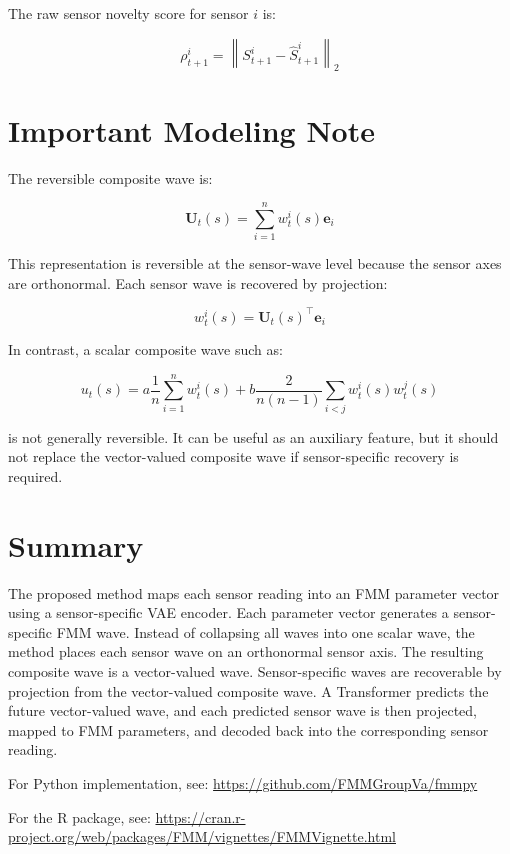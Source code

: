 \documentclass[a4paper]{article}
\begin{document}
        The raw sensor novelty score for sensor \(i\) is:
        
        \begin{equation}
            \rho_{t+1}^i
            =
            \left\lVert
                S_{t+1}^i
            -
                \hat{S}_{t+1}^i
            \right\rVert_2
        \end{equation}
    
    
    \section{Important Modeling Note}
        
        The reversible composite wave is:
        
        \begin{equation}
            \mathbf{U}_t(s)
            =
            \sum_{i=1}^{n}
            w_t^i(s)
            \mathbf{e}_i
        \end{equation}
        
        This representation is reversible at the sensor-wave level because the sensor axes are orthonormal.
        Each sensor wave is recovered by projection:
        
        \begin{equation}
            w_t^i(s)
            =
            \mathbf{U}_t(s)^{\top}
            \mathbf{e}_i
        \end{equation}
        
        In contrast, a scalar composite wave such as:
        
        \begin{equation}
            u_t(s)
            =
            a
            \frac{1}{n}
            \sum_{i=1}^{n}
            w_t^i(s)
            +
            b
            \frac{2}{n(n-1)}
            \sum_{i<j}
            w_t^i(s)
            w_t^j(s)
        \end{equation}
        
        is not generally reversible.
        It can be useful as an auxiliary feature, but it should not replace the vector-valued composite wave if sensor-specific recovery is required.
    
    
    \section{Summary}
        
        The proposed method maps each sensor reading into an FMM parameter vector using a sensor-specific VAE encoder.
        Each parameter vector generates a sensor-specific FMM wave.
        Instead of collapsing all waves into one scalar wave, the method places each sensor wave on an orthonormal sensor axis.
        The resulting composite wave is a vector-valued wave.
        Sensor-specific waves are recoverable by projection from the vector-valued composite wave.
        A Transformer predicts the future vector-valued wave, and each predicted sensor wave is then projected, mapped to FMM parameters, and decoded back into the corresponding sensor reading.
        
        For Python implementation, see:
        \url{https://github.com/FMMGroupVa/fmmpy}
        
        For the R package, see:
        \url{https://cran.r-project.org/web/packages/FMM/vignettes/FMMVignette.html}
\end{document}
